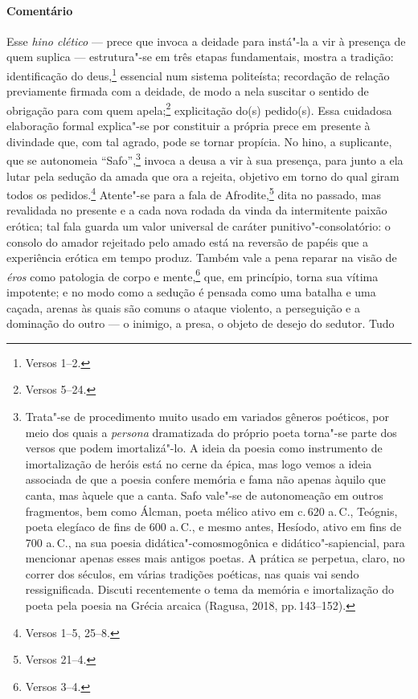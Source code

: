 \paragraph{Comentário} Esse \emph{hino clético} --- prece que invoca a deidade para instá"-la a vir à 
presença de quem suplica --- estrutura"-se em três etapas
fundamentais, mostra a tradição: identificação do deus,\footnote{Versos 1--2.} essencial
num sistema politeísta; recordação de relação previamente firmada com a
deidade, de modo a nela suscitar o sentido de obrigação para com quem apela;\footnote{Versos 5--24.} explicitação do(s) pedido(s). Essa cuidadosa elaboração
formal explica"-se por constituir a própria prece em presente à divindade que, com
tal agrado, pode se tornar propícia. No hino, a suplicante, que se autonomeia
``Safo'',\footnote{Trata"-se de procedimento muito usado em variados gêneros poéticos, por meio dos quais a \emph{persona} dramatizada do próprio poeta torna"-se parte dos versos que podem imortalizá"-lo. A ideia da poesia como instrumento de imortalização de heróis está no cerne da épica, mas logo vemos a ideia associada de que a poesia confere memória e fama não apenas àquilo que canta, mas àquele que a canta. Safo vale"-se de autonomeação em outros fragmentos, bem como Álcman, poeta mélico ativo em c.\,620 a.\,C., Teógnis, poeta elegíaco de fins de 600 a.\,C., e mesmo antes, Hesíodo, ativo em fins de 700 a.\,C., na sua poesia didática"-comosmogônica e didático"-sapiencial, para mencionar apenas esses mais antigos poetas. A prática se perpetua, claro, no correr dos séculos, em várias tradições poéticas, nas quais vai sendo ressignificada. Discuti recentemente o tema da memória e imortalização do poeta pela poesia na Grécia arcaica (Ragusa, 2018, pp.\,143--152).} invoca a deusa
a vir à sua presença, para junto a ela lutar pela sedução da amada que ora a
rejeita, objetivo em torno do qual giram todos os pedidos.\footnote{Versos 1--5, 25--8.}
Atente"-se para a fala de Afrodite,\footnote{Versos 21--4.} dita no passado, mas
revalidada no presente e a cada nova rodada da vinda da intermitente paixão
erótica; tal fala guarda um valor universal de caráter punitivo"-consolatório: o
consolo do amador rejeitado pelo amado está na reversão de papéis que a
experiência erótica em tempo produz. Também vale a pena reparar na visão de
\emph{éros} como patologia de corpo e mente,\footnote{Versos 3--4.} que, em princípio,
torna sua vítima impotente; e no modo como a sedução é pensada como uma batalha
e uma caçada, arenas às quais são comuns o ataque violento, a perseguição e a
dominação do outro --- o inimigo, a presa, o objeto de desejo do sedutor. Tudo
